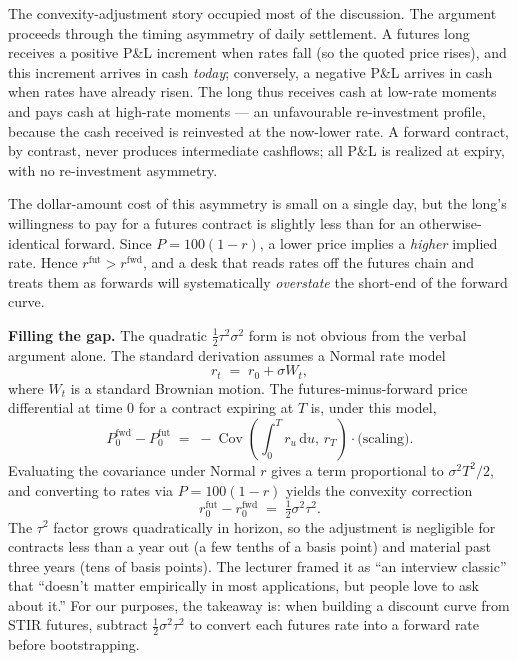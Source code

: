 The convexity-adjustment story occupied most of the discussion. The
argument proceeds through the timing asymmetry of daily settlement. A
futures long receives a positive P\&L increment when rates fall (so the
quoted price rises), and this increment arrives in cash \emph{today};
conversely, a negative P\&L arrives in cash when rates have already risen.
The long thus receives cash at low-rate moments and pays cash at
high-rate moments --- an unfavourable re-investment profile, because the
cash received is reinvested at the now-lower rate. A forward contract, by
contrast, never produces intermediate cashflows; all P\&L is realized at
expiry, with no re-investment asymmetry.

The dollar-amount cost of this asymmetry is small on a single day, but the
long's willingness to pay for a futures contract is slightly less than for
an otherwise-identical forward. Since $P = 100(1-r)$, a lower price implies
a \emph{higher} implied rate. Hence $r^{\text{fut}} > r^{\text{fwd}}$, and
a desk that reads rates off the futures chain and treats them as forwards
will systematically \emph{overstate} the short-end of the forward curve.

\begin{tipblock}
\textbf{Filling the gap.} The quadratic $\tfrac12 \tau^2 \sigma^2$ form is
not obvious from the verbal argument alone. The standard derivation
assumes a Normal rate model
\[
  r_t \;=\; r_0 + \sigma W_t,
\]
where $W_t$ is a standard Brownian motion. The futures-minus-forward
price differential at time 0 for a contract expiring at $T$ is, under
this model,
\[
  P^{\text{fwd}}_0 - P^{\text{fut}}_0 \;=\; -\operatorname{Cov}\!\left(\textstyle\int_0^T r_u\, \mathrm{d}u,\, r_T\right) \cdot \text{(scaling)}.
\]
Evaluating the covariance under Normal $r$ gives a term proportional to
$\sigma^2 T^2 / 2$, and converting to rates via $P = 100(1-r)$ yields the
convexity correction
\[
  r^{\text{fut}}_0 - r^{\text{fwd}}_0 \;=\; \tfrac{1}{2}\sigma^2 \tau^2.
\]
The $\tau^2$ factor grows quadratically in horizon, so the adjustment is
negligible for contracts less than a year out (a few tenths of a basis
point) and material past three years (tens of basis points). The lecturer
framed it as ``an interview classic'' that ``doesn't matter empirically in
most applications, but people love to ask about it.'' For our purposes, the
takeaway is: when building a discount curve from STIR futures, subtract
$\tfrac12 \sigma^2 \tau^2$ to convert each futures rate into a forward rate
before bootstrapping.
\end{tipblock}

